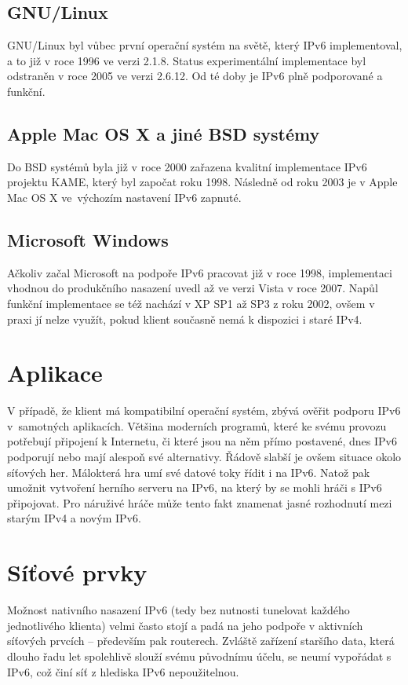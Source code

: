\documentclass[12pt]{report}
\begin{document}
\subsection{GNU/Linux}
GNU/Linux byl vůbec první operační systém na světě, který IPv6 implementoval, a to již v roce 1996 ve verzi 2.1.8. Status experimentální implementace byl odstraněn v roce 2005 ve verzi 2.6.12. Od té doby je IPv6 plně podporované a funkční.

\subsection{Apple Mac OS X a jiné BSD systémy}
Do BSD systémů byla již v roce 2000 zařazena kvalitní implementace IPv6 projektu KAME, který byl započat roku 1998. Následně od roku 2003 je v Apple Mac OS X ve~výchozím nastavení IPv6 zapnuté.

\subsection{Microsoft Windows}
Ačkoliv začal Microsoft na podpoře IPv6 pracovat již v roce 1998, implementaci vhodnou do produkčního nasazení uvedl až ve verzi Vista v roce 2007. Napůl funkční implementace se též nachází v XP SP1 až SP3 z roku 2002, ovšem v praxi jí nelze využít, pokud klient současně nemá k dispozici i staré IPv4.

\section{Aplikace}
V případě, že klient má kompatibilní operační systém, zbývá ověřit podporu IPv6 v~samotných aplikacích. Většina moderních programů, které ke svému provozu potřebují připojení k Internetu, či které jsou na něm přímo postavené, dnes IPv6 podporují nebo mají alespoň své alternativy. Řádově slabší je ovšem situace okolo síťových her. Málokterá hra umí své datové toky řídit i na IPv6. Natož pak umožnit vytvoření herního serveru na IPv6, na který by se mohli hráči s IPv6 připojovat. Pro náruživé hráče může tento fakt znamenat jasné rozhodnutí mezi starým IPv4 a novým IPv6.

\section{Síťové prvky}
Možnost nativního nasazení IPv6 (tedy bez nutnosti tunelovat každého jednotlivého klienta) velmi často stojí a padá na jeho podpoře v aktivních síťových prvcích -- především pak routerech. Zvláště zařízení staršího data, která dlouho řadu let spolehlivě slouží svému původnímu účelu, se neumí vypořádat s IPv6, což činí síť z hlediska IPv6 nepoužitelnou.
\end{document}
